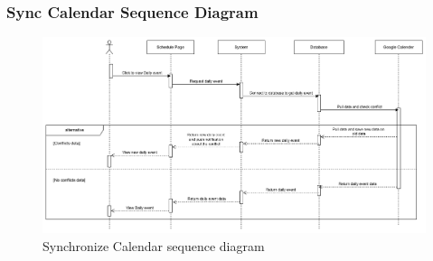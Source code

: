 \subsubsection{Sync Calendar Sequence Diagram}
\begin{figure}[H]
    \centering
    \includegraphics[width=1\textwidth, height=0.3\textheight]{image/SyncCalendar.png} 
    \caption{Synchronize Calendar sequence diagram}
    \label{fig:sync_calendar_sequence}
\end{figure}

